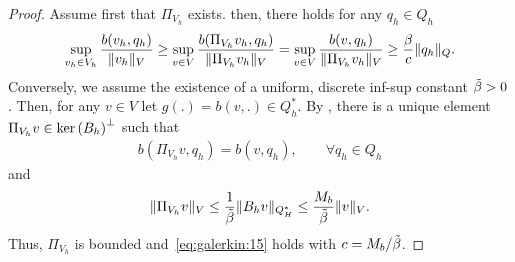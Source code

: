 \begin{proof}
  Assume first that $\Pi_{V_h}$ exists. then, there holds for any
  $q_h\in Q_h$
  \begin{gather}
    \sup_{v_h\in V_h} \frac{b(v_h, q_h)}{\lVert v_h\rVert_V}
    \ge
    \sup_{v\in V} \frac{b(\Pi_{V_h}v_h, q_h)}{\lVert\Pi_{V_h} v_h\rVert_V}
    =
    \sup_{v\in V} \frac{b(v, q_h)}{\lVert\Pi_{V_h} v_h\rVert_V}
    \ge \frac{\beta}{c} \lVert q_h\rVert_Q.
  \end{gather}
  Conversely, we assume the existence of a uniform, discrete inf-sup
  constant $\tilde{\beta}>0$. Then, for any $v\in V$ let
  $g(.) = b(v,.) \in Q_h^*$. By
  , there is a unique
  element $\Pi_{V_h} v \in {\operatorname{ker}\left(B_h\right)}^\perp$ such that
  \begin{gather}
    b(\Pi_{V_h}v,q_h) = b(v, q_h),\qquad\forall q_h\in Q_h
  \end{gather}
  and
  \begin{gather}
    \lVert\Pi_{V_h}v\rVert_V
    \le \frac1{\tilde{\beta}}\lVert B_h v\rVert_{Q_H^*}
    \le \frac{M_b}{\tilde{\beta}} \lVert v\rVert_V.
  \end{gather}
  Thus, $\Pi_{V_h}$ is bounded and~\eqref{eq:galerkin:15} holds with
  $c=M_b/\tilde{\beta}$.
\end{proof}

